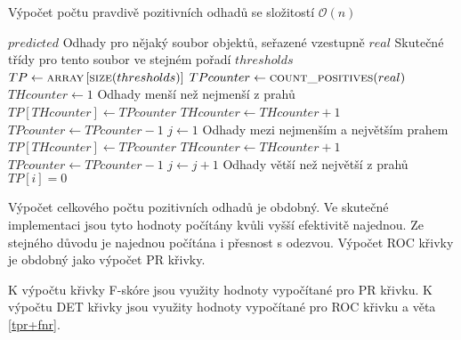 \begin{algorithm}
	\caption{Výpočet počtu pravdivě pozitivních odhadů se složitostí \( \mathcal O \left( n \right) \)}
	\label{TP}
	\begin{algorithmic}
		\Require $ predicted $ \Comment Odhady pro nějaký soubor objektů, seřazené vzestupně
		\Require $ real $ \Comment Skutečné třídy pro tento soubor ve stejném pořadí
		\Require $ thresholds $
		\Statex
		\State $ TP \gets \Call{array}{} \left[ \Call{size}{thresholds} \right] $
		\State $ TPcounter \gets \Call{count\_positives}{real} $
		\State $ THcounter \gets 1 $
		 \Comment Odhady menší než nejmenší z prahů
				\Break
			\EndIf
			\State $ TP \left[ THcounter \right] \gets TPcounter $
				\State $ THcounter \gets THcounter + 1 $
		\EndFor
			\State $ TPcounter \gets TPcounter - 1 $
		\EndIf
		\State $ j \gets 1 $
		 \Comment Odhady mezi nejmenším a největším prahem
				\State $ TP \left[ THcounter \right] \gets TPcounter $
				\State $ THcounter \gets THcounter + 1 $
			\Else
					\State $ TPcounter \gets TPcounter - 1 $
				\EndIf
				\State $ j \gets j + 1 $
			\EndIf
		\EndWhile
		 \Comment Odhady větší než největší z prahů
			\State $ TP \left[ i \right] = 0 $
		\EndFor
	\end{algorithmic}
\end{algorithm}

Výpočet celkového počtu pozitivních odhadů je obdobný. Ve skutečné implementaci jsou tyto hodnoty počítány kvůli vyšší efektivitě najednou. Ze stejného důvodu je najednou počítána i přesnost s odezvou. Výpočet ROC křivky je obdobný jako výpočet PR křivky.

K výpočtu křivky F-skóre jsou využity hodnoty vypočítané pro PR křivku. K výpočtu DET křivky jsou využity hodnoty vypočítané pro ROC křivku a věta \ref{tpr+fnr}.
